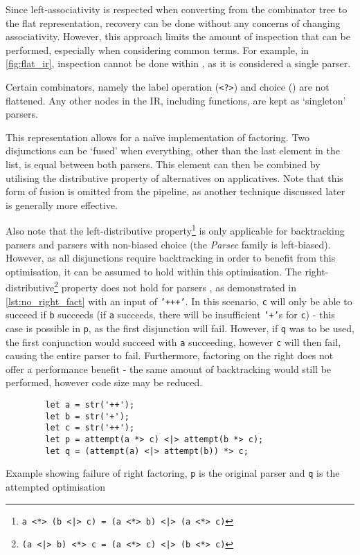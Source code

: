 Since left-associativity is respected when converting from the combinator tree to the flat representation, recovery can be done without any concerns of changing associativity.
However, this approach limits the amount of inspection that can be performed, especially when considering common terms.
For example, in \autoref{fig:flat_ir}, inspection cannot be done within \texttt{\mult}, as it is considered a single parser.

Certain combinators, namely the label operation (\texttt{<?>}) and choice (\texttt{\choice}) are not flattened.
Any other nodes in the IR, including functions, are kept as `singleton' parsers.

This representation allows for a na\"ive implementation of factoring.
Two disjunctions can be `fused' when everything, other than the last element in the list, is equal between both parsers.
This element can then be combined by utilising the distributive property of alternatives on applicatives.
Note that this form of fusion is omitted from the pipeline, as another technique discussed later is generally more effective.

Also note that the left-distributive property\footnote{\texttt{a <*> (b <|> c) = (a <*> b) <|> (a <*> c)}} is only applicable for backtracking parsers and parsers with non-biased choice (the \textit{Parsec} family is left-biased).
However, as all disjunctions require backtracking in order to benefit from this optimisation, it can be assumed to hold within this optimisation.
The right-distributive\footnote{\texttt{(a <|> b) <*> c = (a <*> c) <|> (b <*> c)}} property does not hold for parsers \cite{typeclassopedia}, as demonstrated in \autoref{lst:no_right_fact} with an input of \texttt{'+++'}.
In this scenario, \texttt{c} will only be able to succeed if \texttt{b} succeeds (if \texttt{a} succeeds, there will be insufficient \texttt{'+'}s for \texttt{c}) - this case is possible in \texttt{p}, as the first disjunction will fail.
However, if \texttt{q} was to be used, the first conjunction would succeed with \texttt{a} succeeding, however \texttt{c} will then fail, causing the entire parser to fail.
Furthermore, factoring on the right does not offer a performance benefit - the same amount of backtracking would still be performed, however code size may be reduced.

\begin{capminted}
    \begin{verbatim}
        let a = str('++');
        let b = str('+');
        let c = str('++');
        let p = attempt(a *> c) <|> attempt(b *> c);
        let q = (attempt(a) <|> attempt(b)) *> c;
    \end{verbatim}
    \vspace{-0.5\baselineskip}
    \caption{Example showing failure of right factoring, \texttt{p} is the original parser and \texttt{q} is the attempted optimisation}
    \label{lst:no_right_fact}
\end{capminted}

